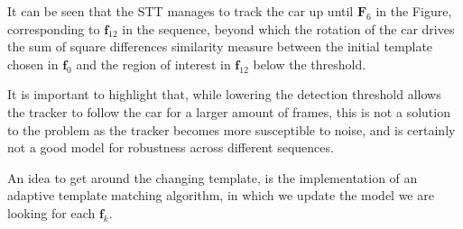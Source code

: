 It can be seen that the STT manages to track the car
up until $\mathbf{F}_{6}$ in the Figure, corresponding to $\mathbf{f}_{12}$ in
the sequence, beyond which the rotation of the car drives the sum of square
differences similarity measure between the initial template chosen in
$\mathbf{f}_0$ and the region of interest in $\mathbf{f}_{12}$ below the
threshold.

It is important to highlight that, while lowering the detection threshold allows
the tracker to follow the car for a larger amount of frames, this is not a
solution to the problem as the tracker becomes more susceptible to noise, and is
certainly not a good model for robustness across different sequences.

An idea to get around the changing template, is the implementation of an
adaptive template matching algorithm, in which we update the model we are
looking for each $\mathbf{f}_k$.



